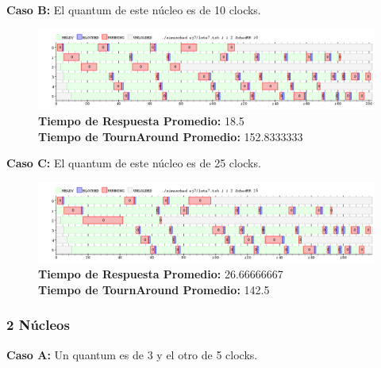 \documentclass[a4paper]{article}
\begin{document}
	
	\textbf{Caso B:} El quantum de este n\'ucleo es de 10 clocks.
	
		 \begin{figure}[h!]
   \begin{center}
 	\includegraphics[scale=0.5]{imagenes/ej7/1nucleoB.png}
 	\textbf{Tiempo de Respuesta Promedio:} 18.5 \\
 	\textbf{Tiempo de TournAround Promedio:} 152.8333333\\
   \end{center}
 \end{figure} 
	
	\textbf{Caso C:} El quantum de este n\'ucleo es de 25 clocks.

		 \begin{figure}[h!]
   \begin{center}
 	\includegraphics[scale=0.5]{imagenes/ej7/1nucleoC.png}
 	\textbf{Tiempo de Respuesta Promedio:} 26.66666667 \\
 	\textbf{Tiempo de TournAround Promedio:} 142.5 \\
   \end{center}
 \end{figure} 	
	
\newpage	
	\subsubsection*{2 N\'ucleos}
	
	\textbf{Caso A:} Un quantum es de 3 y el otro de 5 clocks.
\end{document}
